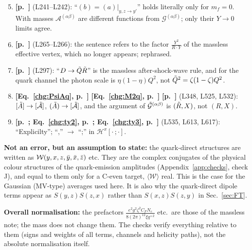 \documentclass[9pt]{article}
\numberwithin{equation}{section}
\begin{document}
\begin{enumerate}\setcounter{enumi}{4}
    \item \textbf{[p.~\pageref{chg:ba}]} (L241--L242): ``$(b)=(a)|_{y,z\rightarrow y'}$'' holds literally only for $m_{f}=0$. With masses $\mathcal{A}^{(\alpha\beta)}$ are different functions from $\mathcal{G}^{(\alpha\beta)}$; only their $Y\rightarrow0$ limits agree.
    \item \textbf{[p.~\pageref{chg:Y2RY}]} (L265--L266): the sentence refers to the factor $\frac{Y^{2}}{R\cdot Y}$ of the massless effective vertex, which no longer appears; rephrased.
    \item \textbf{[p.~\pageref{chg:Drule}]} (L297): ``$D\rightarrow\Tilde{Q}\Tilde{R}$'' is the massless after-shock-wave rule, and for the quark channel the photon scale is $\eta(1-\eta)Q^{2}$, not $\Tilde{Q}^{2}=\zeta(1-\zeta)Q^{2}$.
    \item \textbf{[Eq.~\eqref{chg:PsiAq}, p.~\pageref{chg:PsiAq}]} \textbf{[Eq.~\eqref{chg:M2q}, p.~\pageref{chg:M2q}]} \textbf{[p.~\pageref{chg:Gqarg}]} (L348, L525, L532): $[\Tilde{A}]\rightarrow[\Tilde{\mathcal{A}}]$, $(\Tilde{A})\rightarrow[\Tilde{\mathcal{A}}]$, and the argument of $\Tilde{\mathcal{G}}^{(\alpha\beta)}$ is $(\Tilde{R},X)$, not $(R,X)$.
    \item \textbf{[p.~\pageref{chg:ty}; Eq.~\eqref{chg:ty2}, p.~\pageref{chg:ty2}; Eq.~\eqref{chg:ty3}, p.~\pageref{chg:ty3}]} (L535, L613, L617): ``Explicilty''; ``,'' $\rightarrow$ ``;'' in $\mathcal{H}^{x}[\cdot\,;\cdot]$.
\end{enumerate}
\noindent\textbf{Not an error, but an assumption to state:} the quark-direct structures are written as $\mathcal{W}(y,x,z,\Bar{y},\Bar{x},\Bar{z})$ etc. They are the complex conjugates of the physical colour structures of the quark-emission amplitudes (Appendix~\ref{app:checks}, check J), and equal to them only for a C-even target, $\langle\mathcal{W}\rangle$ real. This is the case for the Gaussian (MV-type) averages used here. It is also why the quark-direct dipole terms appear as $S(y,z)S(z,x)$ rather than $S(x,z)S(z,y)$ in Sec.~\ref{sec:FT}.

\noindent\textbf{Overall normalisation:} the prefactors $\frac{e^{2}g^{2}\zeta^{2}C_{F}N_{c}}{8(2\pi)^{12}\xi q^{+2}}$ etc.\ are those of the massless note; the mass does not change them. The checks verify everything relative to them (signs and weights of all terms, channels and helicity paths), not the absolute normalisation itself.
\end{document}
